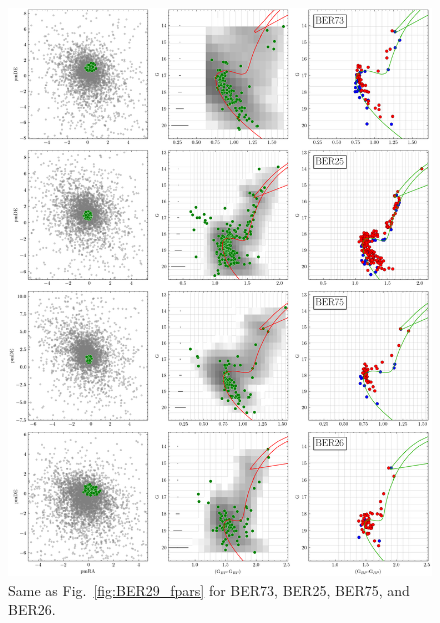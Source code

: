\documentclass[draft]{aa}
\begin{document}
\begin{appendix}
 \begin{figure}[t]
  \centering
  \includegraphics[height=.95\textheight]{figs/0_fpars.png}
  \caption{Same as Fig.~\ref{fig:BER29_fpars} for BER73, BER25, BER75, and BER26.}
  \label{fig:0fpars}
 \end{figure}


\end{appendix}
\end{document}
